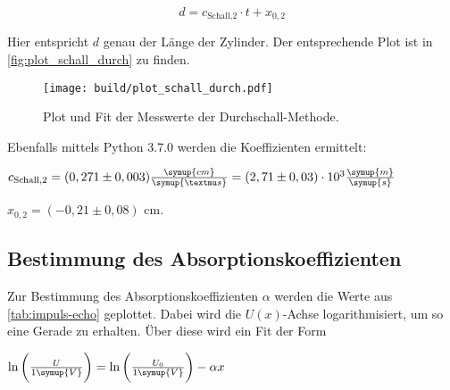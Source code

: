\begin{equation}
    d = c_\text{Schall,2} \cdot t + x_{0,2}
\end{equation}

Hier entspricht $d$ genau der Länge der Zylinder. Der entsprechende Plot ist in \autoref{fig:plot_schall_durch} zu finden.

\begin{figure}
    \centering
    \texttt{[image: build/plot\_schall\_durch.pdf]}
    \caption{Plot und Fit der Messwerte der Durchschall-Methode.}
    \label{fig:plot_schall_durch}
\end{figure}

Ebenfalls mittels Python 3.7.0 werden die Koeffizienten ermittelt:

\begin{center}
    $c_\text{Schall,2} = (0,271 \pm 0,003) \frac{\symup{cm}}{\symup{µs}} = (2,71 \pm 0,03) \cdot 10^{3} \frac{\symup{m}}{\symup{s}}$
    
    $x_{0,2} = (-0,21 \pm 0,08)$ cm.
\end{center}


\subsection{Bestimmung des Absorptionskoeffizienten}

%
%

Zur Bestimmung des Absorptionskoeffizienten $\alpha$ werden die Werte aus \autoref{tab:impuls-echo} geplottet.
Dabei wird die $U(x)$-Achse logarithmisiert, um so eine Gerade zu erhalten.
Über diese wird ein Fit der Form

\begin{center}
    $\ln \bigg( \frac{U}{1 \symup{V}} \bigg) = \ln \bigg( \frac{U_0}{1 \symup{V}} \bigg) - \alpha x$
\end{center}

